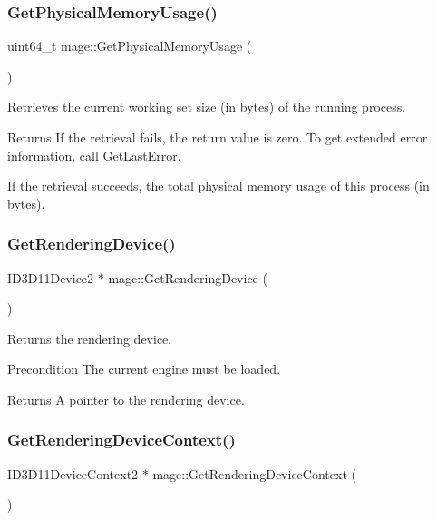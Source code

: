 \subsubsection{\texorpdfstring{Get\+Physical\+Memory\+Usage()}{GetPhysicalMemoryUsage()}}
{\footnotesize\ttfamily uint64\+\_\+t mage\+::\+Get\+Physical\+Memory\+Usage (\begin{DoxyParamCaption}{ }\end{DoxyParamCaption})}

Retrieves the current working set size (in bytes) of the running process.

\begin{DoxyReturn}{Returns}
If the retrieval fails, the return value is zero. To get extended error information, call Get\+Last\+Error. 

If the retrieval succeeds, the total physical memory usage of this process (in bytes). 
\end{DoxyReturn}
\hypertarget{namespacemage_a30c7feb10b2be75bbce6d9c3739899c6}{}\label{namespacemage_a30c7feb10b2be75bbce6d9c3739899c6} 
\subsubsection{\texorpdfstring{Get\+Rendering\+Device()}{GetRenderingDevice()}}
{\footnotesize\ttfamily I\+D3\+D11\+Device2 $\ast$ mage\+::\+Get\+Rendering\+Device (\begin{DoxyParamCaption}{ }\end{DoxyParamCaption})}

Returns the rendering device.

\begin{DoxyPrecond}{Precondition}
The current engine must be loaded. 
\end{DoxyPrecond}
\begin{DoxyReturn}{Returns}
A pointer to the rendering device. 
\end{DoxyReturn}
\hypertarget{namespacemage_a55d3eaa7476e19ec8969e27d69249d95}{}\label{namespacemage_a55d3eaa7476e19ec8969e27d69249d95} 
\subsubsection{\texorpdfstring{Get\+Rendering\+Device\+Context()}{GetRenderingDeviceContext()}}
{\footnotesize\ttfamily I\+D3\+D11\+Device\+Context2 $\ast$ mage\+::\+Get\+Rendering\+Device\+Context (\begin{DoxyParamCaption}{ }\end{DoxyParamCaption})}

